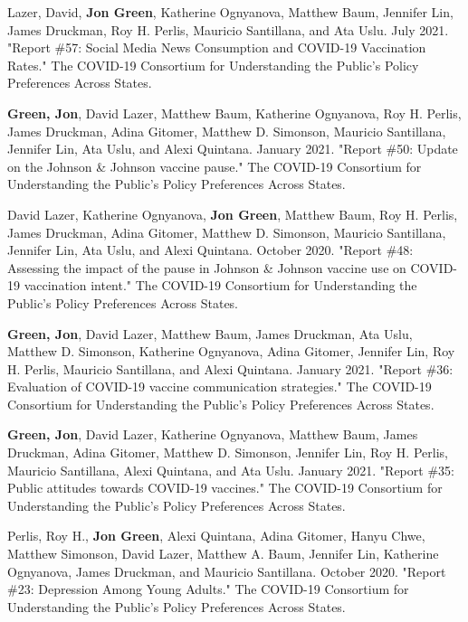 \documentclass[letterpaper]{article}
\renewenvironment{itemize}{
  \begin{list}{}{
    \setlength{\leftmargin}{1.5em}
  }
}{
  \end{list}
}
\begin{document}
\begin{itemize}

\item  Lazer, David, \textbf{Jon Green},  Katherine Ognyanova, Matthew Baum, Jennifer Lin, James Druckman, Roy H. Perlis, Mauricio Santillana, and Ata Uslu. July 2021. "Report \#57: Social Media News Consumption and COVID-19 Vaccination Rates." The COVID-19 Consortium for Understanding the Public’s Policy Preferences Across States.

\item  \textbf{Green, Jon}, David Lazer, Matthew Baum, Katherine Ognyanova, Roy H. Perlis, James Druckman, Adina Gitomer, Matthew D. Simonson, Mauricio Santillana, Jennifer Lin, Ata Uslu, and Alexi Quintana. January 2021. "Report \#50: Update on the Johnson \& Johnson vaccine pause." The COVID-19 Consortium for Understanding the Public’s Policy Preferences Across States.

\item David Lazer, Katherine Ognyanova, \textbf{Jon Green}, Matthew Baum, Roy H. Perlis, James Druckman, Adina Gitomer, Matthew D. Simonson, Mauricio Santillana, Jennifer Lin, Ata Uslu, and Alexi Quintana. October 2020. "Report \#48: Assessing the impact of the pause in Johnson \& Johnson vaccine use on COVID-19 vaccination intent." The COVID-19 Consortium for Understanding the Public’s Policy Preferences Across States.

\item  \textbf{Green, Jon}, David Lazer, Matthew Baum, James Druckman, Ata Uslu, Matthew D. Simonson, Katherine Ognyanova, Adina Gitomer, Jennifer Lin, Roy H. Perlis, Mauricio Santillana, and Alexi Quintana. January 2021. "Report \#36: Evaluation of COVID-19 vaccine communication strategies." The COVID-19 Consortium for Understanding the Public’s Policy Preferences Across States.

\item  \textbf{Green, Jon}, David Lazer, Katherine Ognyanova, Matthew Baum, James Druckman, Adina Gitomer, Matthew D. Simonson, Jennifer Lin, Roy H. Perlis, Mauricio Santillana, Alexi Quintana, and Ata Uslu. January 2021. "Report \#35: Public attitudes towards COVID-19 vaccines." The COVID-19 Consortium for Understanding the Public’s Policy Preferences Across States.

\item Perlis, Roy H., \textbf{Jon Green}, Alexi Quintana, Adina Gitomer, Hanyu Chwe, Matthew Simonson, David Lazer, Matthew A. Baum, Jennifer Lin, Katherine Ognyanova, James Druckman, and Mauricio Santillana. October 2020. "Report \#23: Depression Among Young Adults." The COVID-19 Consortium for Understanding the Public’s Policy Preferences Across States.


\end{itemize}
\end{document}
